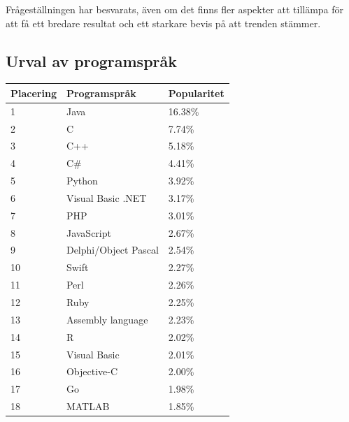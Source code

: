 \documentclass[12pt,swedish]{article}
\begin{document}
Frågeställningen har besvarats, även om det finns fler aspekter att tillämpa för att få ett bredare resultat och ett starkare bevis på att trenden stämmer.

\printbibliography

\begin{appendices}


\section{Urval av programspråk}
\begin{table}[H]
\centering
\label{appendix:table:languages}
\begin{tabular}{lll}
\toprule
Placering & Programspråk         & Popularitet \\ \midrule
1         & Java                 & 16.38\%     \\
2         & C                    & 7.74\%      \\
3         & C++                  & 5.18\%      \\
4         & C\#                  & 4.41\%      \\
5         & Python               & 3.92\%      \\
6         & Visual Basic .NET    & 3.17\%      \\
7         & PHP                  & 3.01\%      \\
8         & JavaScript           & 2.67\%      \\
9         & Delphi/Object Pascal & 2.54\%      \\
10        & Swift                & 2.27\%      \\
11        & Perl                 & 2.26\%      \\
12        & Ruby                 & 2.25\%      \\
13        & Assembly language    & 2.23\%      \\
14        & R                    & 2.02\%      \\
15        & Visual Basic         & 2.01\%      \\
16        & Objective-C          & 2.00\%      \\
17        & Go                   & 1.98\%      \\
18        & MATLAB               & 1.85\%      \\

\end{tabular}
\end{table}
\end{appendices}
\end{document}
